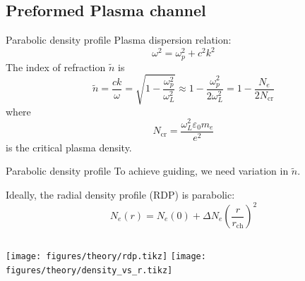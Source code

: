 \documentclass[dvipsnames]{beamer}
\begin{document}
\subsection[]{Preformed Plasma channel}
\begin{frame}{Parabolic density profile}
 Plasma dispersion relation:
 \begin{equation*}
\omega^2=\omega_p^2+c^2k^2
 \end{equation*}
 The index of refraction $\tilde n$ is
 \begin{equation*}
\tilde{n}=\frac{c k}{\omega}=\sqrt{1-\frac{\omega_p^2}{\omega_L^2}}\approx1-\frac{\omega_p^2}{2\omega_L^2}=1-\frac{N_e}{2N_\text{cr}}
 \end{equation*}
 {\small where
\begin{equation*}
 N_\text{cr}=\frac{\omega_L^2\varepsilon_0 m_e}{e^2}
\end{equation*}
is the critical plasma density.}
\end{frame}
\begin{frame}{Parabolic density profile}
 To achieve guiding, we need variation in $\tilde{n}$.

 Ideally, the radial density profile (RDP) is parabolic:
\begin{equation*}
N_e(r)=N_e(0)+\Delta N_e\left( \frac{r}{r_\text{ch}}\right)^2
 \end{equation*}
 \begin{columns}
\texttt{[image: figures/theory/rdp.tikz]}
\texttt{[image: figures/theory/density\_vs\_r.tikz]}
 \end{columns}
\end{frame}
\end{document}
